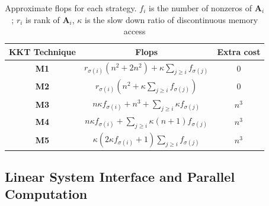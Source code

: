 \begin{table}[h]
  \centering
  \caption{Approximate flops for each strategy. $f_i$ is the number of nonzeros of $\mathbf{A}_i$; $r_i$ is rank of $\mathbf{A}_i$, $\kappa$ is the slow down ratio of discontinuous memory access}
  \begin{tabular}{ccc}
  \toprule
    KKT Technique & Flops & Extra cost \\
    \midrule
    {\textbf{M1}} & $r_{\sigma (i)} (n^2 + 2 n^2) + \kappa \sum_{j \geq i}
    f_{\sigma (j)}$ & 0\\
    {\textbf{M2}} & $r_{\sigma (i)} ( n^2 + \kappa \sum_{j \geq i}
    f_{\sigma (j)} )$ & 0 \\
    {\textbf{M3}} & $n \kappa f_{\sigma (i)} + n^3 + \sum_{j \geq i} \kappa
    f_{\sigma (j)}$ & $n^3$ \\
    {\textbf{M4}} & $n \kappa f_{\sigma (i)} + \sum_{j \geq i} \kappa (n +
    1) f_{\sigma (j)}$ & $n^3$\\
    {\textbf{M5}} & $\kappa (2 \kappa f_{\sigma (i)} + 1)  \sum_{j \geq i}
    f_{\sigma (j)}$ & $n^3$\\
    \bottomrule
  \end{tabular}
\end{table}


\subsection{Linear System Interface and Parallel Computation}

